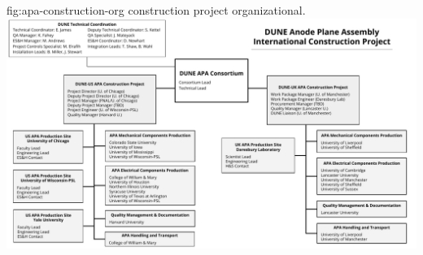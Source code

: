 

\begin{dunefigure}{fig:apa-construction-org}
{ construction project organizational.}
\includegraphics[width=1\textwidth,trim=0mm 0mm 0mm 0mm,clip]{graphics/sp-apa-construction-org-chart.pdf}
\end{dunefigure}

